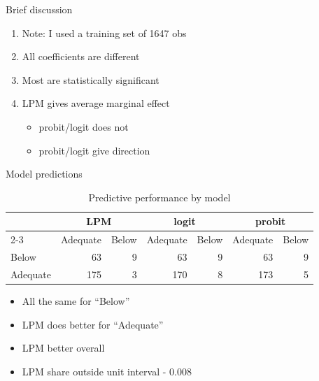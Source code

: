 \documentclass[
  ignorenonframetext,
]{beamer}
\providecommand{\tightlist}{%
  \setlength{\itemsep}{0pt}\setlength{\parskip}{0pt}}
\begin{document}
\begin{frame}{Brief discussion}
\protect{}\label{brief-discussion}
\begin{enumerate}
\tightlist
\item
  Note: I used a training set of 1647 obs
\item
  All coefficients are different
\item
  Most are statistically significant
\item
  LPM gives average marginal effect

  \begin{itemize}
  \tightlist
  \item
    probit/logit does not
  \item
    probit/logit give direction
  \end{itemize}
\end{enumerate}
\end{frame}

\begin{frame}{Model predictions}
\protect{}\label{model-predictions}
\tiny

\begin{table}

\caption{\label{tab:binpredict}Predictive performance by model}
\centering
\begin{tabular}[t]{l|r|r|r|r|r|r}
\hline
\multicolumn{1}{c|}{ } & \multicolumn{2}{c|}{LPM} & \multicolumn{2}{c|}{logit} & \multicolumn{2}{c}{probit} \\
\cline{2-3} \cline{4-5} \cline{6-7}
  & Adequate & Below & Adequate & Below & Adequate & Below\\
\hline
Below & 63 & 9 & 63 & 9 & 63 & 9\\
\hline
Adequate & 175 & 3 & 170 & 8 & 173 & 5\\
\hline
\end{tabular}
\end{table}

\normalsize

\begin{itemize}
\tightlist
\item
  All the same for ``Below''
\item
  LPM does better for ``Adequate''
\item
  LPM better overall
\item
  LPM share outside unit interval - 0.008
\end{itemize}
\end{frame}
\end{document}
